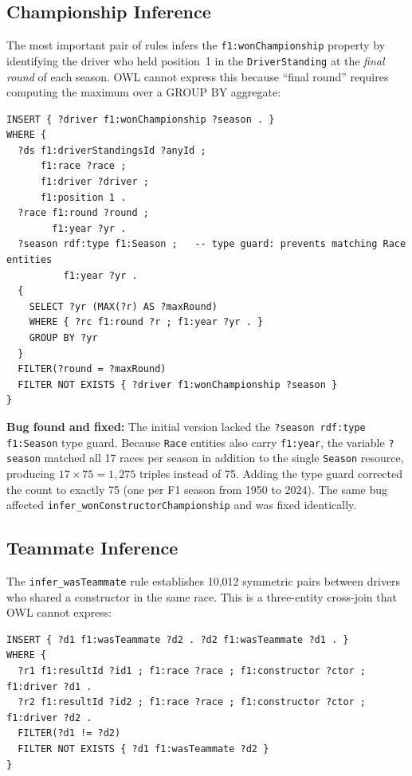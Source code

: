 \documentclass[12pt,a4paper]{article}
\begin{document}
\subsection{Championship Inference}

The most important pair of rules infers the \texttt{f1:wonChampionship} property
by identifying the driver who held position~1 in the \texttt{DriverStanding}
at the \emph{final round} of each season. OWL cannot express this because
``final round'' requires computing the maximum over a GROUP BY aggregate:

\begin{lstlisting}[style=sparql, caption={SPIN rule: infer\_wonChampionship}]
INSERT { ?driver f1:wonChampionship ?season . }
WHERE {
  ?ds f1:driverStandingsId ?anyId ;
      f1:race ?race ;
      f1:driver ?driver ;
      f1:position 1 .
  ?race f1:round ?round ;
        f1:year ?yr .
  ?season rdf:type f1:Season ;   -- type guard: prevents matching Race entities
          f1:year ?yr .
  {
    SELECT ?yr (MAX(?r) AS ?maxRound)
    WHERE { ?rc f1:round ?r ; f1:year ?yr . }
    GROUP BY ?yr
  }
  FILTER(?round = ?maxRound)
  FILTER NOT EXISTS { ?driver f1:wonChampionship ?season }
}
\end{lstlisting}

\begin{infobox}
\textbf{Bug found and fixed:} The initial version lacked the
\texttt{?season rdf:type f1:Season} type guard. Because \texttt{Race} entities
also carry \texttt{f1:year}, the variable \texttt{?season} matched all 17 races
per season in addition to the single \texttt{Season} resource, producing
$17 \times 75 = 1{,}275$ triples instead of 75. Adding the type guard corrected
the count to exactly 75 (one per F1 season from 1950 to 2024).
The same bug affected \texttt{infer\_wonConstructorChampionship} and was fixed
identically.
\end{infobox}

\subsection{Teammate Inference}

The \texttt{infer\_wasTeammate} rule establishes 10{,}012 symmetric pairs between
drivers who shared a constructor in the same race. This is a three-entity cross-join
that OWL cannot express:

\begin{lstlisting}[style=sparql, caption={SPIN rule: infer\_wasTeammate}]
INSERT { ?d1 f1:wasTeammate ?d2 . ?d2 f1:wasTeammate ?d1 . }
WHERE {
  ?r1 f1:resultId ?id1 ; f1:race ?race ; f1:constructor ?ctor ; f1:driver ?d1 .
  ?r2 f1:resultId ?id2 ; f1:race ?race ; f1:constructor ?ctor ; f1:driver ?d2 .
  FILTER(?d1 != ?d2)
  FILTER NOT EXISTS { ?d1 f1:wasTeammate ?d2 }
}
\end{lstlisting}
\end{document}
